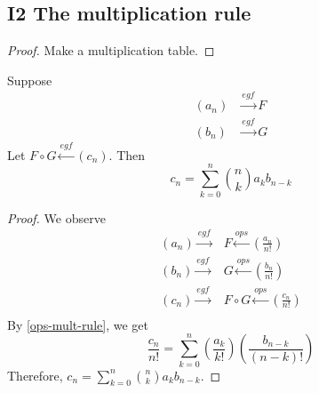 \documentclass[12pt]{article}
\begin{document}
\subsection{I2 The multiplication rule}

\begin{proof}
    Make a multiplication table.
    \tbd{}
\end{proof}

\begin{proposition}
    Suppose $$\begin{aligned}
        (a_n)&\xrightarrow{egf}F\\
        (b_n)&\xrightarrow{egf}G
    \end{aligned}$$ Let $F\circ G\xleftarrow{egf}(c_n)$. Then \[c_n=\sum_{k=0}^{n}{n\choose k}a_kb_{n-k}\]
\end{proposition}
\begin{proof}
    We observe \begin{align*}
        (a_n)\xrightarrow{egf}&F\xleftarrow{ops}\left(\frac{a_n}{n!}\right)\\
        (b_n)\xrightarrow{egf}&G\xleftarrow{ops}\left(\frac{b_n}{n!}\right)\\
        (c_n)\xrightarrow{egf}&F\circ G\xleftarrow{ops}\left(\frac{c_n}{n!}\right)\\
    \end{align*}
    By \cref{ops-mult-rule}, we get \[\frac{c_n}{n!}=\sum_{k=0}^{n}\left(\frac{a_k}{k!}\right)\left(\frac{b_{n-k}}{(n-k)!}\right)\]
    Therefore, $\displaystyle c_n=\sum_{k=0}^{n}{n\choose k}a_kb_{n-k}$.
\end{proof}
\end{document}

